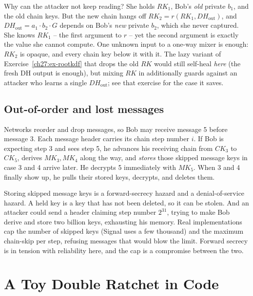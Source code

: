 \begin{walkbox}
Why can the attacker not keep reading? She holds $RK_1$, Bob's \emph{old} private $b_1$, and the old chain keys. But the new chain hangs off $RK_2 = r(RK_1, DH_{\mathrm{out}})$, and $DH_{\mathrm{out}} = a_1 \cdot b_2 \cdot G$ depends on Bob's \emph{new} private $b_2$, which she never captured. She knows $RK_1$ -- the first argument to $r$ -- yet the second argument is exactly the value she cannot compute. One unknown input to a one-way mixer is enough: $RK_2$ is opaque, and every chain key below it with it. The lazy variant of Exercise~\ref{ch27:ex-rootkdf} that drops the old $RK$ would still self-heal \emph{here} (the fresh DH output is enough), but mixing $RK$ in additionally guards against an attacker who learns a single $DH_{\mathrm{out}}$; see that exercise for the case it saves.
\end{walkbox}

\subsection{Out-of-order and lost messages}
\label{ch27:out-of-order}

Networks reorder and drop messages, so Bob may receive message 5 before message 3. Each message header carries its chain step number $i$. If Bob is expecting step 3 and sees step 5, he advances his receiving chain from $CK_3$ to $CK_5$, derives $MK_3, MK_4$ along the way, and \emph{stores} those skipped message keys in case 3 and 4 arrive later. He decrypts 5 immediately with $MK_5$. When 3 and 4 finally show up, he pulls their stored keys, decrypts, and deletes them.

\begin{trapbox}
Storing skipped message keys is a forward-secrecy hazard and a denial-of-service hazard. A held key is a key that has not been deleted, so it can be stolen. And an attacker could send a header claiming step number $2^{31}$, trying to make Bob derive and store two billion keys, exhausting his memory. Real implementations cap the number of skipped keys (Signal uses a few thousand) and the maximum chain-skip per step, refusing messages that would blow the limit. Forward secrecy is in tension with reliability here, and the cap is a compromise between the two.
\end{trapbox}

\section{A Toy Double Ratchet in Code}
\label{ch27:toy-code}

